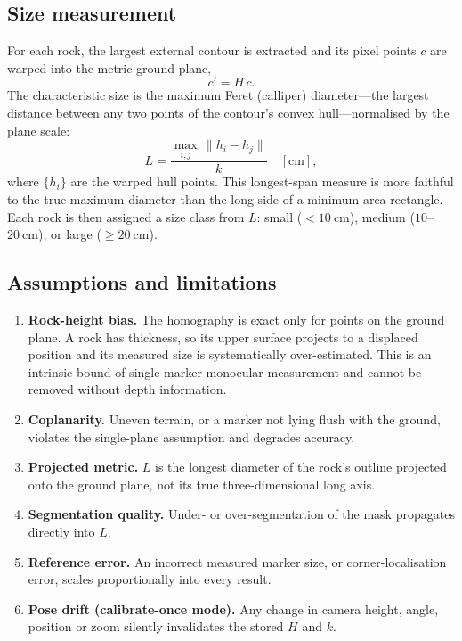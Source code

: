 \subsection{Size measurement}
\label{sec:size}
For each rock, the largest external contour is extracted and its pixel points $c$
are warped into the metric ground plane,
\begin{equation}
  c' = H\,c .
  \label{eq:warp}
\end{equation}
The characteristic size is the maximum Feret (calliper) diameter---the largest
distance between any two points of the contour's convex hull---normalised by the
plane scale:
\begin{equation}
  L = \frac{\displaystyle\max_{i,j}\,\lVert h_i - h_j\rVert}{k}\quad[\mathrm{cm}],
  \label{eq:feret}
\end{equation}
where $\{h_i\}$ are the warped hull points. This longest-span measure is more
faithful to the true maximum diameter than the long side of a minimum-area
rectangle. Each rock is then assigned a size class from $L$: small
($<10~\mathrm{cm}$), medium ($10$--$20~\mathrm{cm}$), or large
($\geq 20~\mathrm{cm}$).

\subsection{Assumptions and limitations}
\label{sec:limitations}
\begin{enumerate}
  \item \textbf{Rock-height bias.} The homography is exact only for points on the
        ground plane. A rock has thickness, so its upper surface projects to a
        displaced position and its measured size is systematically
        over-estimated. This is an intrinsic bound of single-marker monocular
        measurement and cannot be removed without depth information.
  \item \textbf{Coplanarity.} Uneven terrain, or a marker not lying flush with
        the ground, violates the single-plane assumption and degrades accuracy.
  \item \textbf{Projected metric.} $L$ is the longest diameter of the rock's
        outline projected onto the ground plane, not its true three-dimensional
        long axis.
  \item \textbf{Segmentation quality.} Under- or over-segmentation of the mask
        propagates directly into $L$.
  \item \textbf{Reference error.} An incorrect measured marker size, or
        corner-localisation error, scales proportionally into every result.
  \item \textbf{Pose drift (calibrate-once mode).} Any change in camera height,
        angle, position or zoom silently invalidates the stored $H$ and $k$.
\end{enumerate}
